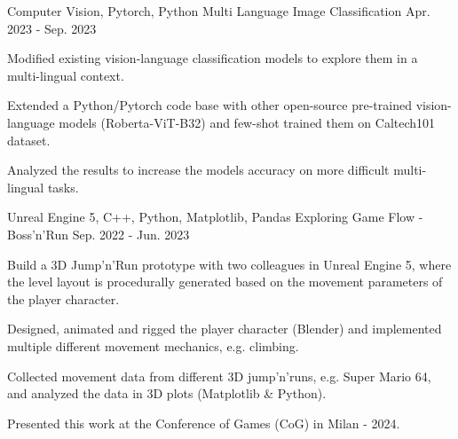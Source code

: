 \begin{cventries}
  \cventry
    {Computer Vision, Pytorch, Python} %
    {Multi Language Image Classification} %
    {\href{https://github.com/BrandnerKasper/MP_CustomCoOp}{\faGithubSquare}} %
    {Apr. 2023 - Sep. 2023} %
    {
      \begin{cvitems} %
        \item {Modified existing vision-language classification models to explore them in a multi-lingual context.}
        \item {Extended a Python/Pytorch code base with other open-source pre-trained vision-language models (Roberta-ViT-B32) and few-shot trained them on Caltech101 dataset.}
        \item {Analyzed the results to increase the models accuracy on more difficult multi-lingual tasks.}
      \end{cvitems}
    }

  \cventry
    {Unreal Engine 5, C++, Python, Matplotlib, Pandas} %
    {Exploring Game Flow - Boss'n'Run} %
    {\href{https://brandnerkasper.itch.io/bossn-run}{\faGamepad}} %
    {Sep. 2022 - Jun. 2023} %
    {
      \begin{cvitems} %
        \item {Build a 3D Jump'n'Run prototype with two colleagues in Unreal Engine 5, where the level layout is procedurally generated based on the movement parameters of the player character.}
        \item {Designed, animated and rigged the player character (Blender) and implemented multiple different movement mechanics, e.g. climbing.}
        \item {Collected movement data from different 3D jump'n'runs, e.g. Super Mario 64, and analyzed the data in 3D plots (Matplotlib \& Python).}%
        \item {Presented this work at the Conference of Games (CoG) in Milan - 2024.}
      \end{cvitems}
    }
    

\end{cventries}
